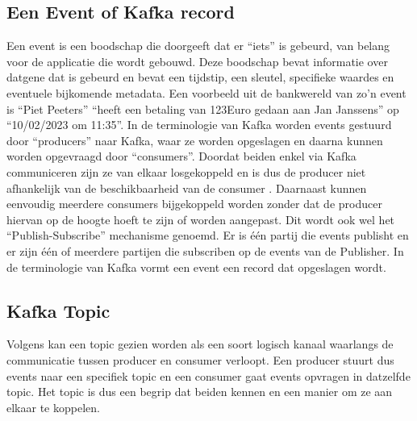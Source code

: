 \subsection{Een Event of Kafka record}
Een event is een boodschap die doorgeeft dat er ``iets'' is gebeurd, van belang voor de applicatie die wordt gebouwd. Deze boodschap bevat informatie over datgene dat is gebeurd en bevat een tijdstip, een sleutel, specifieke waardes en eventuele bijkomende metadata. Een voorbeeld uit de bankwereld van zo'n event is ``Piet Peeters'' ``heeft een betaling van 123Euro gedaan aan Jan Janssens'' op ``10/02/2023 om 11:35''.
\newline
In de terminologie van Kafka worden events gestuurd door ``producers'' naar Kafka, waar ze worden opgeslagen en daarna kunnen worden opgevraagd door ``consumers''. Doordat beiden enkel via Kafka communiceren zijn ze van elkaar losgekoppeld en is dus de producer niet afhankelijk van de beschikbaarheid van de consumer \autocite{Kafka2023}.
\newline
Daarnaast kunnen eenvoudig meerdere consumers bijgekoppeld worden zonder dat de producer hiervan op de hoogte hoeft te zijn of worden aangepast.
\newline
Dit wordt ook wel het ``Publish-Subscribe'' mechanisme genoemd. Er is \'e\'en partij die events publisht en er zijn \'e\'en of meerdere partijen die subscriben op de events van de Publisher.
In de terminologie van Kafka vormt een event een record dat opgeslagen wordt.


\subsection{Kafka Topic}
Volgens \textcite{Harbour2023} kan een topic gezien worden als een soort logisch kanaal waarlangs de communicatie tussen producer en consumer verloopt. Een producer stuurt dus events naar een specifiek topic en een consumer gaat events opvragen in datzelfde topic. Het topic is dus een begrip dat beiden kennen en een manier om ze aan elkaar te koppelen.


